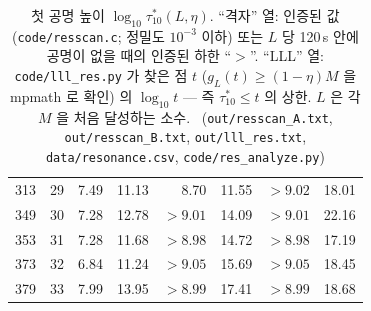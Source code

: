 \begin{table}[ht]
\begin{tabular}{rrrrrrrr}
313 & 29 & 7.49 & 11.13 & 8.70 & 11.55 & $>9.02$ & 18.01\\
349 & 30 & 7.28 & 12.78 & $>9.01$ & 14.09 & $>9.01$ & 22.16\\
353 & 31 & 7.28 & 11.68 & $>8.98$ & 14.72 & $>8.98$ & 17.19\\
373 & 32 & 6.84 & 11.24 & $>9.05$ & 15.69 & $>9.05$ & 18.45\\
379 & 33 & 7.99 & 13.95 & $>8.99$ & 17.41 & $>8.99$ & 18.68\\
\bottomrule
\end{tabular}
\caption{첫 공명 높이 $\log_{10}\tau^*_{10}(L,\eta)$. ``격자'' 열: 인증된 값 (\texttt{code/resscan.c}; 정밀도 $10^{-3}$ 이하) 또는
$L$ 당 120\,s 안에 공명이 없을 때의 인증된 하한 ``$>$''. ``LLL'' 열: \texttt{code/lll\_res.py} 가 찾은 점 $t$ ($g_L(t)\ge(1-\eta)M$ 을 mpmath 로 확인) 의
$\log_{10}t$ --- 즉 $\tau^*_{10}\le t$ 의 상한. $L$ 은 각 $M$ 을 처음 달성하는 소수. \NUMERIC\
(\texttt{out/resscan\_A.txt}, \texttt{out/resscan\_B.txt}, \texttt{out/lll\_res.txt}, \texttt{data/resonance.csv}, \texttt{code/res\_analyze.py})}\label{NUM:tab-res}
\end{table}

